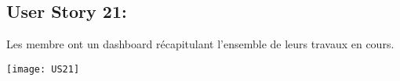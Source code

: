 \newpage{}
\subsection{User Story 21:}
Les membre ont un dashboard récapitulant l'ensemble de leurs travaux en cours.


  \begin{center}
        \texttt{[image: US21]}
  \end{center}